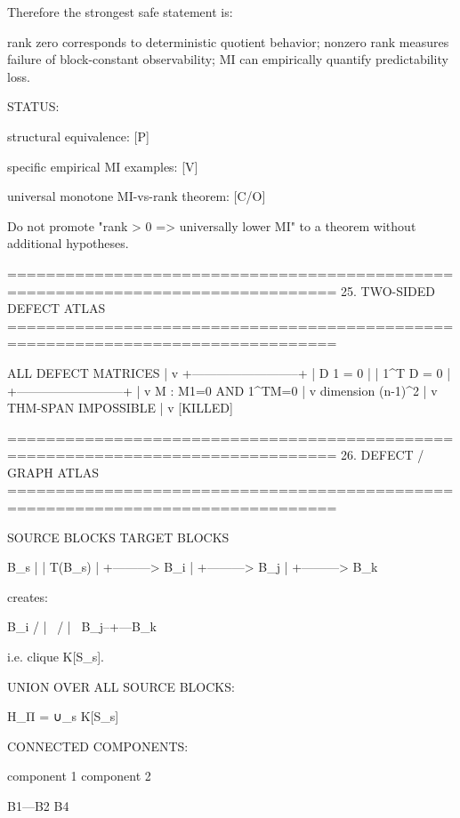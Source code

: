 Therefore the strongest safe statement is:

rank zero corresponds to deterministic quotient behavior;
nonzero rank measures failure of block-constant observability;
MI can empirically quantify predictability loss.

STATUS:

structural equivalence:
[P]

specific empirical MI examples:
[V]

universal monotone MI-vs-rank theorem:
[C/O]

Do not promote "rank > 0 => universally lower MI" to a theorem without
additional hypotheses.

================================================================================
25. TWO-SIDED DEFECT ATLAS
================================================================================

                    ALL DEFECT MATRICES
                           |
                           v
              +--------------------------+
              | D 1 = 0                  |
              | 1^T D = 0                |
              +--------------------------+
                           |
                           v
       { M : M1=0 AND 1^TM=0 }
                           |
                           v
                    dimension (n-1)^2
                           |
                           v
                  THM-SPAN IMPOSSIBLE
                           |
                           v
                       [KILLED]

================================================================================
26. DEFECT / GRAPH ATLAS
================================================================================

SOURCE BLOCKS                    TARGET BLOCKS

 B_s
  |
  | T(B_s)
  |
  +---------> B_i
  |
  +---------> B_j
  |
  +---------> B_k

creates:

             B_i
            / | \
           /  |  \
         B_j--+---B_k

i.e. clique K[S_s].

UNION OVER ALL SOURCE BLOCKS:

H_Π = ∪_s K[S_s]

CONNECTED COMPONENTS:

       component 1       component 2

       B1---B2            B4

